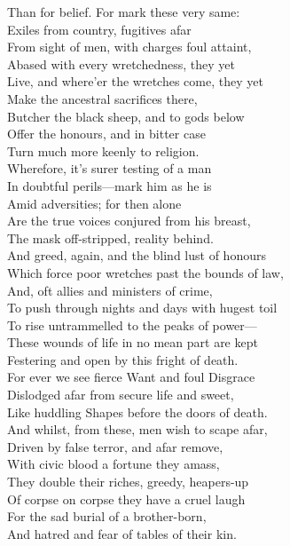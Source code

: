 Than for belief. For mark these very same:\\
Exiles from country, fugitives afar\\
From sight of men, with charges foul attaint,\\
Abased with every wretchedness, they yet\\
Live, and where'er the wretches come, they yet\\
Make the ancestral sacrifices there,\\
Butcher the black sheep, and to gods below\\
Offer the honours, and in bitter case\\
Turn much more keenly to religion.\\
Wherefore, it's surer testing of a man\\
In doubtful perils—mark him as he is\\
Amid adversities; for then alone\\
Are the true voices conjured from his breast,\\
The mask off-stripped, reality behind.\\
And greed, again, and the blind lust of honours\\
Which force poor wretches past the bounds of law,\\
And, oft allies and ministers of crime,\\
To push through nights and days with hugest toil\\
To rise untrammelled to the peaks of power—\\
These wounds of life in no mean part are kept\\
Festering and open by this fright of death.\\
For ever we see fierce Want and foul Disgrace\\
Dislodged afar from secure life and sweet,\\
Like huddling Shapes before the doors of death.\\
And whilst, from these, men wish to scape afar,\\
Driven by false terror, and afar remove,\\
With civic blood a fortune they amass,\\
They double their riches, greedy, heapers-up\\
Of corpse on corpse they have a cruel laugh\\
For the sad burial of a brother-born,\\
And hatred and fear of tables of their kin.\\
